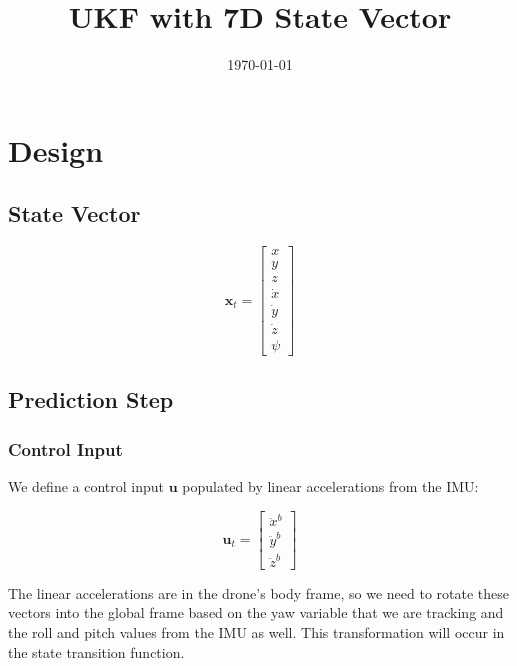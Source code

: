 \documentclass{article}
\title{UKF with 7D State Vector}
\author{\todo{Student name here}}
\date{\today}
\begin{document}
\maketitle

\section{Design}

\subsection{State Vector}

\begin{equation}
\mathbf{x}_t = \begin{bmatrix}
x \\
y \\
z \\
\dot x \\
\dot y \\
\dot z \\
\psi \end{bmatrix}
\end{equation}

\subsection{Prediction Step}

\subsubsection{Control Input}

We define a control input $\mathbf{u}$ populated by linear accelerations from the IMU:

\begin{equation}
\mathbf{u}_t = \begin{bmatrix}
\ddot x^b \\
\ddot y^b \\
\ddot z^b
\end{bmatrix}
\end{equation}

The linear accelerations are in the drone's body frame, so we need to rotate these vectors into the global frame based on the yaw variable that we are tracking and the roll and pitch values from the IMU as well. This transformation will occur in the state transition function.
\end{document}
